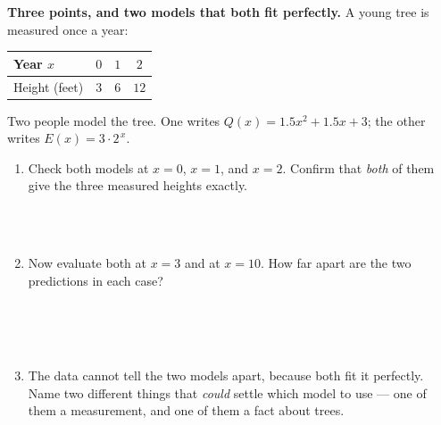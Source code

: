 \documentclass[10pt]{article}
\begin{document}
\boxguard[26]
\begin{extensionbox}
\small
\textbf{Three points, and two models that both fit perfectly.} A young tree is measured once a year:

\smallskip
\renewcommand{\arraystretch}{1.3}
\begin{center}
\begin{tabular}{@{}|l|c|c|c|@{}}
\hline
Year $x$ & $0$ & $1$ & $2$ \\ \hline
Height (feet) & $3$ & $6$ & $12$ \\
\hline
\end{tabular}
\end{center}

\smallskip
Two people model the tree. One writes $Q(x) = 1.5x^2 + 1.5x + 3$; the other writes
$E(x) = 3 \cdot 2^{\,x}$.

\begin{enumerate}[label=(\alph*), leftmargin=1.6em, itemsep=5pt, topsep=4pt]
  \item Check both models at $x=0$, $x=1$, and $x=2$. Confirm that \emph{both} of them give the three
        measured heights exactly.

\\
\\

  \item Now evaluate both at $x=3$ and at $x=10$. How far apart are the two predictions in each case?

\\
\\
\\

  \item The data cannot tell the two models apart, because both fit it perfectly. Name two different
        things that \emph{could} settle which model to use --- one of them a measurement, and one of
        them a fact about trees.

\\
\\
\\
\end{enumerate}
\end{extensionbox}
\end{document}
